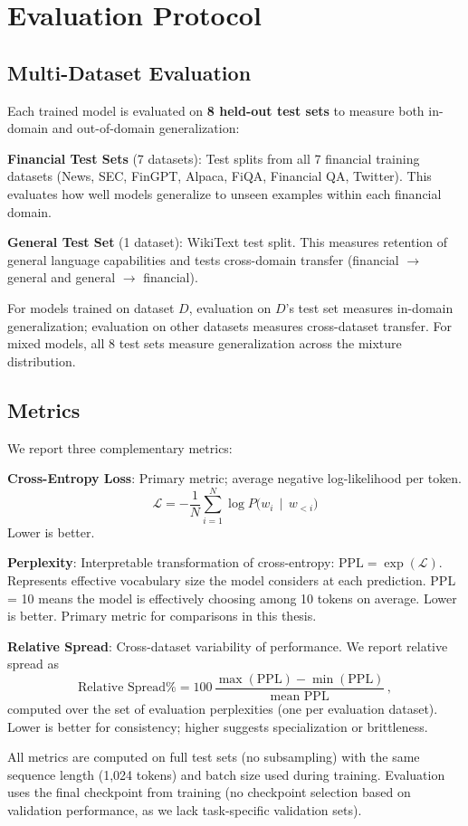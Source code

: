 \section{Evaluation Protocol}

\subsection{Multi-Dataset Evaluation}

Each trained model is evaluated on \textbf{8 held-out test sets} to measure both in-domain and out-of-domain generalization:

\textbf{Financial Test Sets} (7 datasets): Test splits from all 7 financial training datasets (News, SEC, FinGPT, Alpaca, FiQA, Financial QA, Twitter). This evaluates how well models generalize to unseen examples within each financial domain.

\textbf{General Test Set} (1 dataset): WikiText test split. This measures retention of general language capabilities and tests cross-domain transfer (financial $\to$ general and general $\to$ financial).

For models trained on dataset $D$, evaluation on $D$'s test set measures in-domain generalization; evaluation on other datasets measures cross-dataset transfer. For mixed models, all 8 test sets measure generalization across the mixture distribution.

\subsection{Metrics}

We report three complementary metrics:

\textbf{Cross-Entropy Loss}: Primary metric; average negative log-likelihood per token.
\begin{equation*}
    \mathcal{L} = -\frac{1}{N}\sum_{i=1}^{N} \log P\bigl(w_i \,\mid\, w_{<i}\bigr)
\end{equation*}
Lower is better.

\textbf{Perplexity}: Interpretable transformation of cross-entropy: $\text{PPL} = \exp(\mathcal{L})$. Represents effective vocabulary size the model considers at each prediction. PPL = 10 means the model is effectively choosing among 10 tokens on average. Lower is better. Primary metric for comparisons in this thesis.

\textbf{Relative Spread}: Cross-dataset variability of performance. We report relative spread as
\begin{equation*}
    \text{Relative Spread}\% = 100\,\frac{\max(\text{PPL}) - \min(\text{PPL})}{\text{mean PPL}}\, ,
\end{equation*}
computed over the set of evaluation perplexities (one per evaluation dataset). Lower is better for consistency; higher suggests specialization or brittleness.

All metrics are computed on full test sets (no subsampling) with the same sequence length (1,024 tokens) and batch size used during training. Evaluation uses the final checkpoint from training (no checkpoint selection based on validation performance, as we lack task-specific validation sets).
